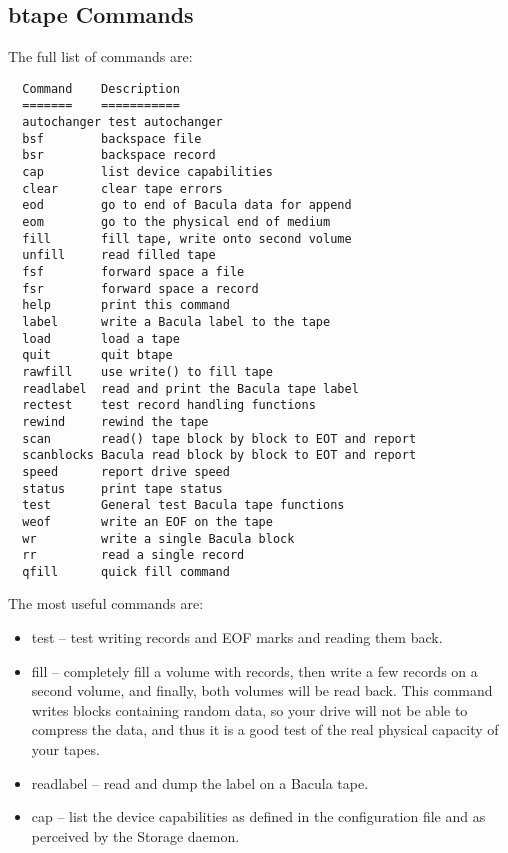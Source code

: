 \subsection{btape Commands}

The full list of commands are:

\footnotesize
\begin{verbatim}
  Command    Description
  =======    ===========
  autochanger test autochanger
  bsf        backspace file
  bsr        backspace record
  cap        list device capabilities
  clear      clear tape errors
  eod        go to end of Bacula data for append
  eom        go to the physical end of medium
  fill       fill tape, write onto second volume
  unfill     read filled tape
  fsf        forward space a file
  fsr        forward space a record
  help       print this command
  label      write a Bacula label to the tape
  load       load a tape
  quit       quit btape
  rawfill    use write() to fill tape
  readlabel  read and print the Bacula tape label
  rectest    test record handling functions
  rewind     rewind the tape
  scan       read() tape block by block to EOT and report
  scanblocks Bacula read block by block to EOT and report
  speed      report drive speed
  status     print tape status
  test       General test Bacula tape functions
  weof       write an EOF on the tape
  wr         write a single Bacula block
  rr         read a single record
  qfill      quick fill command
\end{verbatim}
\normalsize

The most useful commands are:

\begin{itemize}
\item test -- test writing records and EOF marks and  reading them back.
\item fill -- completely fill a volume with records, then  write a few records
   on a second volume, and finally,  both volumes will be read back.
   This command writes blocks containing random data, so your drive will
   not be able to compress the data, and thus it is a good test of
   the real physical capacity of your tapes.
\item readlabel -- read and dump the label on a Bacula tape.
\item cap -- list the device capabilities as defined in the  configuration
   file and as perceived by the Storage daemon.
   \end{itemize}

